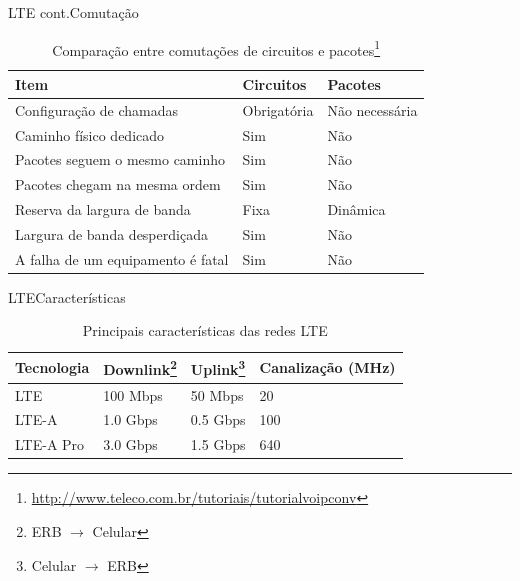 \documentclass[10pt]{beamer}
\begin{document}
\begin{frame}{LTE cont.}{Comutação}
\begin{table}[]
\begin{tabular}{l|l|l}
\hline
\textbf{Item} & \textbf{Circuitos} & \textbf{Pacotes} \\ \hline
Configuração de chamadas          & Obrigatória                     & Não necessária                \\ \hline
Caminho físico dedicado           & Sim                             & Não                           \\ \hline
Pacotes seguem o mesmo caminho    & Sim                             & Não                           \\ \hline
Pacotes chegam na mesma ordem     & Sim                             & Não                           \\ \hline
Reserva da largura de banda       & Fixa                            & Dinâmica                      \\ \hline
Largura de banda desperdiçada     & Sim                             & Não                           \\ \hline
A falha de um equipamento é fatal & Sim                             & Não                          \\ \hline
\end{tabular}
\caption{Comparação entre comutações de circuitos e pacotes\footnote{\url{http://www.teleco.com.br/tutoriais/tutorialvoipconv}}}
\end{table}
\end{frame}

\begin{frame}{LTE}{Características}
\begin{table}[]
\begin{tabular}{l|l|l|l}
Tecnologia      & Downlink\footnote{ERB $\rightarrow$ Celular} & Uplink\footnote{Celular $\rightarrow$ ERB}   & Canalização (MHz) \\ \hline
LTE             & 100 Mbps & 50 Mbps  & 20                \\ \hline
LTE-A           & 1.0 Gbps & 0.5 Gbps & 100               \\ \hline
LTE-A Pro       & 3.0 Gbps & 1.5 Gbps & 640               \\
\end{tabular}
\caption{Principais características das redes LTE}
\end{table}

\end{frame}
\end{document}
